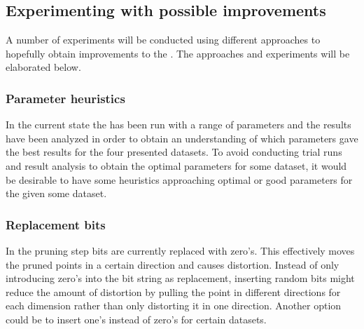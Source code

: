 \subsection{Experimenting with possible improvements}
A number of experiments will be conducted using different approaches to hopefully obtain improvements to the \qs{}. The approaches and experiments will be elaborated below.

\subsubsection{Parameter heuristics}
In the current state the \qs{} has been run with a range of parameters and the results have been analyzed in order to obtain an understanding of which parameters gave the best results for the four presented datasets. To avoid conducting trial runs and result analysis to obtain the optimal parameters for some dataset, it would be desirable to have some heuristics approaching optimal or good parameters for the \qs{} given some dataset.

\subsubsection{Replacement bits}
In the pruning step bits are currently replaced with zero's. This effectively moves the pruned points in a certain direction and causes distortion. Instead of only introducing zero's into the bit string as replacement, inserting random bits might reduce the amount of distortion by pulling the point in different directions for each dimension rather than only distorting it in one direction. Another option could be to insert one's instead of zero's for certain datasets. 

